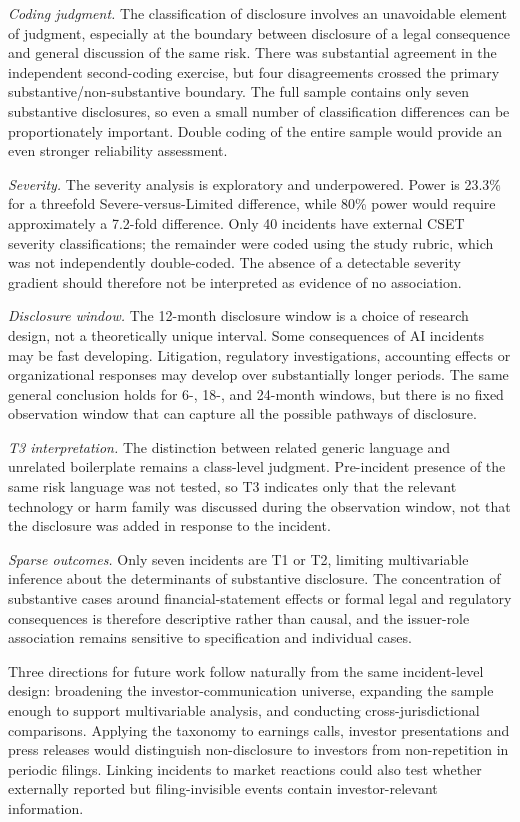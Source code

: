 \documentclass[utf8]{FrontiersinHarvard}
\begin{document}
\textit{Coding judgment.} The classification of disclosure involves an unavoidable element of judgment, especially at the boundary between disclosure of a legal consequence and general discussion of the same risk. There was substantial agreement in the independent second-coding exercise, but four disagreements crossed the primary substantive/non-substantive boundary. The full sample contains only seven substantive disclosures, so even a small number of classification differences can be proportionately important. Double coding of the entire sample would provide an even stronger reliability assessment.

\textit{Severity.} The severity analysis is exploratory and underpowered. Power is 23.3\% for a threefold Severe-versus-Limited difference, while 80\% power would require approximately a 7.2-fold difference. Only 40 incidents have external CSET severity classifications; the remainder were coded using the study rubric, which was not independently double-coded. The absence of a detectable severity gradient should therefore not be interpreted as evidence of no association.

\textit{Disclosure window.} The 12-month disclosure window is a choice of research design, not a theoretically unique interval. Some consequences of AI incidents may be fast developing. Litigation, regulatory investigations, accounting effects or organizational responses may develop over substantially longer periods. The same general conclusion holds for 6-, 18-, and 24-month windows, but there is no fixed observation window that can capture all the possible pathways of disclosure.

\textit{T3 interpretation.} The distinction between related generic language and unrelated boilerplate remains a class-level judgment. Pre-incident presence of the same risk language was not tested, so T3 indicates only that the relevant technology or harm family was discussed during the observation window, not that the disclosure was added in response to the incident.

\textit{Sparse outcomes.} Only seven incidents are T1 or T2, limiting multivariable inference about the determinants of substantive disclosure. The concentration of substantive cases around financial-statement effects or formal legal and regulatory consequences is therefore descriptive rather than causal, and the issuer-role association remains sensitive to specification and individual cases.

Three directions for future work follow naturally from the same incident-level design: broadening the investor-communication universe, expanding the sample enough to support multivariable analysis, and conducting cross-jurisdictional comparisons. Applying the taxonomy to earnings calls, investor presentations and press releases would distinguish non-disclosure to investors from non-repetition in periodic filings. Linking incidents to market reactions could also test whether externally reported but filing-invisible events contain investor-relevant information.
\end{document}
